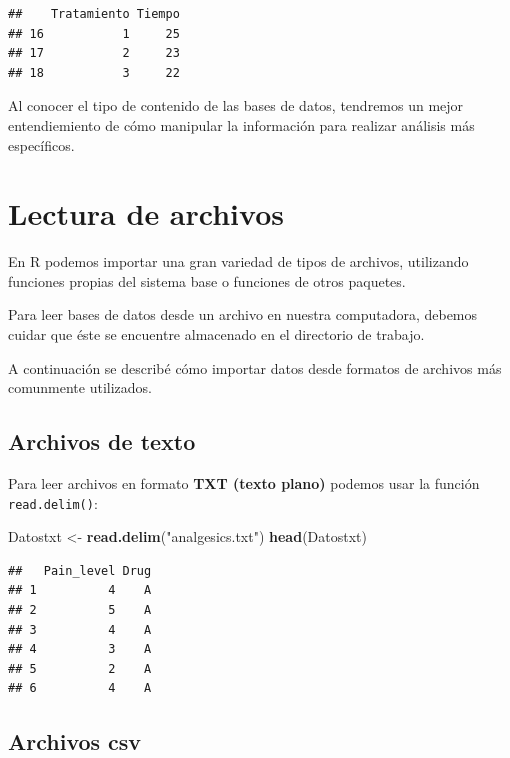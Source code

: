 \documentclass[
]{book}
\newenvironment{Shaded}{\begin{snugshade}}{\end{snugshade}}
\newcommand{\FunctionTok}[1]{\textcolor[rgb]{0.13,0.29,0.53}{\textbf{#1}}}
\newcommand{\NormalTok}[1]{#1}
\newcommand{\OtherTok}[1]{\textcolor[rgb]{0.56,0.35,0.01}{#1}}
\newcommand{\StringTok}[1]{\textcolor[rgb]{0.31,0.60,0.02}{#1}}
\begin{document}
\begin{verbatim}
##    Tratamiento Tiempo
## 16           1     25
## 17           2     23
## 18           3     22
\end{verbatim}

Al conocer el tipo de contenido de las bases de datos, tendremos un mejor entendiemiento de cómo manipular la información para realizar análisis más específicos.

\hypertarget{lectura-de-archivos}{%
\chapter{Lectura de archivos}\label{lectura-de-archivos}}

En R podemos importar una gran variedad de tipos de archivos, utilizando funciones propias del sistema base o funciones de otros paquetes.

Para leer bases de datos desde un archivo en nuestra computadora, debemos cuidar que éste se encuentre almacenado en el directorio de trabajo.

A continuación se describé cómo importar datos desde formatos de archivos más comunmente utilizados.

\hypertarget{archivos-de-texto}{%
\section{Archivos de texto}\label{archivos-de-texto}}

Para leer archivos en formato \textbf{TXT (texto plano)} podemos usar la función \texttt{read.delim()}:

\begin{Shaded}
\begin{Highlighting}[]
\NormalTok{Datostxt }\OtherTok{\textless{}{-}} \FunctionTok{read.delim}\NormalTok{(}\StringTok{"analgesics.txt"}\NormalTok{)}
\FunctionTok{head}\NormalTok{(Datostxt)}
\end{Highlighting}
\end{Shaded}

\begin{verbatim}
##   Pain_level Drug
## 1          4    A
## 2          5    A
## 3          4    A
## 4          3    A
## 5          2    A
## 6          4    A
\end{verbatim}

\hypertarget{archivos-csv}{%
\section{Archivos csv}\label{archivos-csv}}
\end{document}
